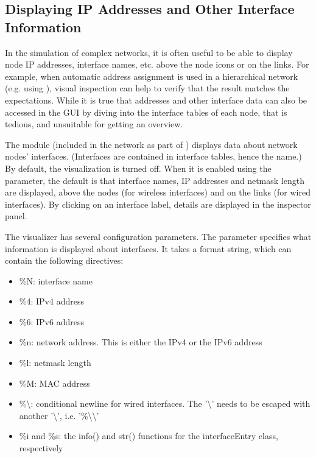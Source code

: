 \subsection{Displaying IP Addresses and Other Interface Information}
\label{sec:visualization:displaying-ip-addresses-and-other-interface-information}

In the simulation of complex networks, it is often useful to be able to display
node IP addresses, interface names, etc. above the node icons or on the links.
For example, when automatic address assignment is used in a hierarchical network
(e.g. using ), visual inspection can help to
verify that the result matches the expectations. While it is true that addresses and other
interface data can also be accessed in the GUI by diving into the interface
tables of each node, that is tedious, and unsuitable for getting an overview.

The  module (included in the network as part of
) displays data about network nodes' interfaces.
(Interfaces are contained in interface tables, hence the name.) By default, the
visualization is turned off. When it is enabled using the
 parameter, the default is that interface names, IP
addresses and netmask length are displayed, above the nodes (for wireless
interfaces) and on the links (for wired interfaces). By clicking on an interface
label, details are displayed in the inspector panel.

The visualizer has several configuration parameters. The  parameter
specifies what information is displayed about interfaces. It takes a format
string, which can contain the following directives:

\begin{itemize}
  \item \%N: interface name
  \item \%4: IPv4 address
  \item \%6: IPv6 address
  \item \%n: network address. This is either the IPv4 or the IPv6 address
  \item \%l: netmask length
  \item \%M: MAC address
  \item \%\textbackslash: conditional newline for wired interfaces. The '\textbackslash'
  needs to be escaped with another '\textbackslash', i.e. '\%\textbackslash\textbackslash'
  \item \%i and \%s: the info() and str() functions for the interfaceEntry class, respectively
\end{itemize}

